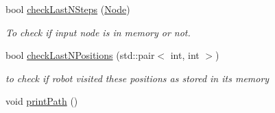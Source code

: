\begin{DoxyCompactItemize}
bool \hyperlink{classRandomPlanner_a8d8b412bf2830bd5e8c0552579ee4ac7}{check\+Last\+N\+Steps} (\hyperlink{structNode}{Node})
\begin{DoxyCompactList}\small\item\em To check if input node is in memory or not. \end{DoxyCompactList}\item 
bool \hyperlink{classRandomPlanner_a8a9000b5fc9027440301639d7509c435}{check\+Last\+N\+Positions} (std\+::pair$<$ int, int $>$)
\begin{DoxyCompactList}\small\item\em to check if robot visited these positions as stored in its memory \end{DoxyCompactList}\item 
void \hyperlink{classRandomPlanner_aef5cf09de25f1532988f565af19ac390}{print\+Path} ()\hypertarget{classRandomPlanner_aef5cf09de25f1532988f565af19ac390}{}\label{classRandomPlanner_aef5cf09de25f1532988f565af19ac390}


\end{DoxyCompactItemize}

